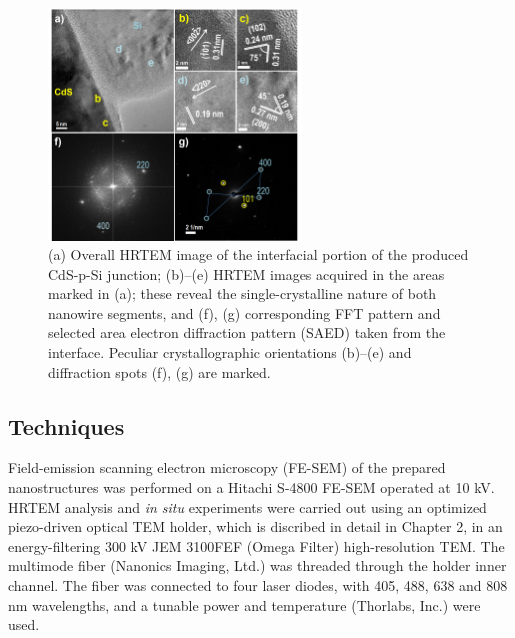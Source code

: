 \begin{figure} 
\centering
\includegraphics[width=0.6\textwidth]{figures/figure3_2}
\caption[HRTEM analysis on junction.]{(a) Overall HRTEM image of the interfacial portion of the produced CdS-p-Si junction; (b)–(e) HRTEM images acquired in the areas marked in (a); these reveal the single-crystalline nature of both nanowire segments, and (f), (g) corresponding FFT pattern and selected area electron diffraction pattern (SAED) taken from the interface. Peculiar crystallographic orientations (b)–(e) and diffraction spots (f), (g) are marked.
\label{fig:fig3_2}}
\end{figure}

\subsection{Techniques}
Field-emission scanning electron microscopy (FE-SEM) of the prepared nanostructures was performed on a Hitachi S-4800 FE-SEM operated at 10 kV. HRTEM analysis and {\em in situ} experiments were carried out using an optimized piezo-driven optical TEM holder, which is discribed in detail in Chapter 2, in an energy-filtering 300 kV JEM 3100FEF (Omega Filter) high-resolution TEM. The multimode fiber (Nanonics Imaging, Ltd.) was threaded through the holder inner channel. The fiber was connected to four laser diodes, with 405, 488, 638 and 808 nm wavelengths, and a tunable power and temperature (Thorlabs, Inc.) were used. \\


